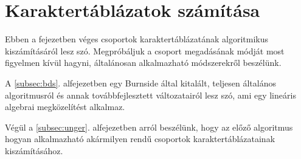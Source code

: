 \section{Karaktertáblázatok számítása}
\label{sec:karakter}
Ebben a fejezetben véges csoportok karaktertáblázatának algoritmikus kiszámításáról lesz szó.
Megpróbáljuk a csoport megadásának módját most figyelmen kívül hagyni, általánosan alkalmazható
módszerekről beszélünk.

A \ref{subsec:bds}. alfejezetben egy Burnside által kitalált, teljesen általános algoritmusról
és annak továbbfejlesztett változatairól lesz szó, ami egy lineáris algebrai megközelítést alkalmaz.


Végül a \ref{subsec:unger}. alfejezetben arról beszélünk, hogy az előző algoritmus hogyan alkalmazható
akármilyen rendű csoportok karaktertáblázatainak kiszámításához.





\clearpage
